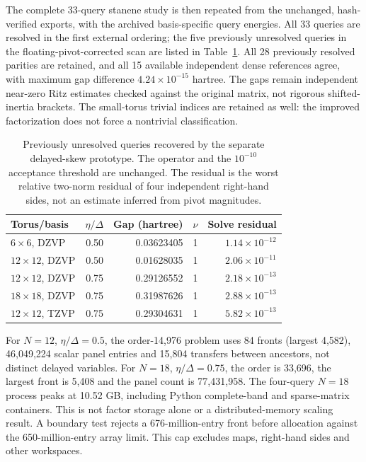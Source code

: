 \documentclass[11pt]{article}
\begin{document}
The complete 33-query stanene study is then repeated from the unchanged,
hash-verified exports, with the archived basis-specific query energies.
All 33 queries are resolved in the first external ordering; the five
previously unresolved queries in the floating-pivot-corrected scan are
listed in Table~\ref{tab:si-delayed-skew}. All 28 previously resolved
parities are retained, and all 15 available independent dense references
agree, with maximum gap difference $4.24\times10^{-15}$ hartree.
The gaps remain independent near-zero Ritz estimates checked against
the original matrix, not rigorous shifted-inertia brackets.
The small-torus trivial indices are retained as well: the improved
factorization does not force a nontrivial classification.

\begin{table}[htbp]
\centering\small
\begin{tabular}{lrrrr}
\toprule
Torus/basis & $\eta/\Delta$ & Gap (hartree) & $\nu$ & Solve residual\\
\midrule
$6\times6$, DZVP & 0.50 & 0.03623405 & 1 & $1.14\times10^{-12}$\\
$12\times12$, DZVP & 0.50 & 0.01628035 & 1 & $2.06\times10^{-11}$\\
$12\times12$, DZVP & 0.75 & 0.29126552 & 1 & $2.18\times10^{-13}$\\
$18\times18$, DZVP & 0.75 & 0.31987626 & 1 & $2.88\times10^{-13}$\\
$12\times12$, TZVP & 0.75 & 0.29304631 & 1 & $5.82\times10^{-13}$\\
\bottomrule
\end{tabular}
\caption{Previously unresolved queries recovered by the separate delayed-skew
prototype. The operator and the $10^{-10}$ acceptance threshold are unchanged.
The residual is the worst relative two-norm residual of four independent
right-hand sides, not an estimate inferred from pivot magnitudes.}
\label{tab:si-delayed-skew}
\end{table}

For $N=12$, $\eta/\Delta=0.5$, the order-14,976 problem uses
84 fronts (largest 4,582), 46,049,224 scalar panel entries and 15,804
transfers between ancestors, not distinct delayed variables.
For $N=18$, $\eta/\Delta=0.75$, the order is 33,696,
the largest front is 5,408 and the panel count is 77,431,958.
The four-query $N=18$ process peaks at 10.52 GB, including Python
complete-band and sparse-matrix containers. This is not factor storage
alone or a distributed-memory scaling result. A boundary test rejects
a 676-million-entry front before allocation against the 650-million-entry
array limit. This cap excludes maps, right-hand sides and other workspaces.
\end{document}
